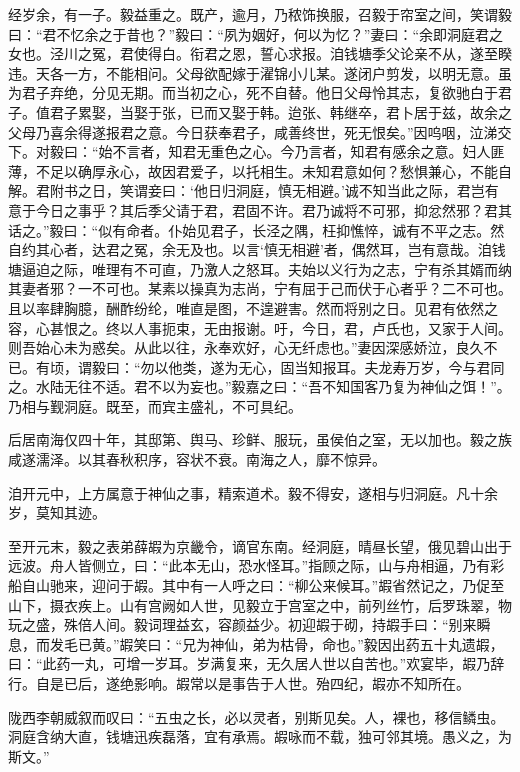 \documentclass[UTF8,titlepage,oneside]{ctexbook}
\begin{document}
经岁余，有一子。毅益重之。既产，逾月，乃秾饰换服，召毅于帘室之间，笑谓毅曰：“君不忆余之于昔也？”毅曰：“夙为姻好，何以为忆？”妻曰：“余即洞庭君之女也。泾川之冤，君使得白。衔君之恩，誓心求报。洎钱塘季父论亲不从，遂至睽违。天各一方，不能相问。父母欲配嫁于濯锦小儿某。遂闭户剪发，以明无意。虽为君子弃绝，分见无期。而当初之心，死不自替。他日父母怜其志，复欲驰白于君子。值君子累娶，当娶于张，已而又娶于韩。迨张、韩继卒，君卜居于兹，故余之父母乃喜余得遂报君之意。今日获奉君子，咸善终世，死无恨矣。”因呜咽，泣涕交下。对毅曰：“始不言者，知君无重色之心。今乃言者，知君有感余之意。妇人匪薄，不足以确厚永心，故因君爱子，以托相生。未知君意如何？愁惧兼心，不能自解。君附书之日，笑谓妾曰：‘他日归洞庭，慎无相避。’诚不知当此之际，君岂有意于今日之事乎？其后季父请于君，君固不许。君乃诚将不可邪，抑忿然邪？君其话之。”毅曰：“似有命者。仆始见君子，长泾之隅，枉抑憔悴，诚有不平之志。然自约其心者，达君之冤，余无及也。以言‘慎无相避’者，偶然耳，岂有意哉。洎钱塘逼迫之际，唯理有不可直，乃激人之怒耳。夫始以义行为之志，宁有杀其婿而纳其妻者邪？一不可也。某素以操真为志尚，宁有屈于己而伏于心者乎？二不可也。且以率肆胸臆，酬酢纷纶，唯直是图，不遑避害。然而将别之日。见君有依然之容，心甚恨之。终以人事扼束，无由报谢。吁，今日，君，卢氏也，又家于人间。则吾始心未为惑矣。从此以往，永奉欢好，心无纤虑也。”妻因深感娇泣，良久不已。有顷，谓毅曰：“勿以他类，遂为无心，固当知报耳。夫龙寿万岁，今与君同之。水陆无往不适。君不以为妄也。”毅嘉之曰：“吾不知国客乃复为神仙之饵！”。乃相与觐洞庭。既至，而宾主盛礼，不可具纪。

后居南海仅四十年，其邸第、舆马、珍鲜、服玩，虽侯伯之室，无以加也。毅之族咸遂濡泽。以其春秋积序，容状不衰。南海之人，靡不惊异。

洎开元中，上方属意于神仙之事，精索道术。毅不得安，遂相与归洞庭。凡十余岁，莫知其迹。

至开元末，毅之表弟薛嘏为京畿令，谪官东南。经洞庭，晴昼长望，俄见碧山出于远波。舟人皆侧立，曰：“此本无山，恐水怪耳。”指顾之际，山与舟相逼，乃有彩船自山驰来，迎问于嘏。其中有一人呼之曰：“柳公来候耳。”嘏省然记之，乃促至山下，摄衣疾上。山有宫阙如人世，见毅立于宫室之中，前列丝竹，后罗珠翠，物玩之盛，殊倍人间。毅词理益玄，容颜益少。初迎嘏于砌，持嘏手曰：“别来瞬息，而发毛已黄。”嘏笑曰：“兄为神仙，弟为枯骨，命也。”毅因出药五十丸遗嘏，曰：“此药一丸，可增一岁耳。岁满复来，无久居人世以自苦也。”欢宴毕，嘏乃辞行。自是已后，遂绝影响。嘏常以是事告于人世。殆四纪，嘏亦不知所在。

陇西李朝威叙而叹曰：“五虫之长，必以灵者，别斯见矣。人，裸也，移信鳞虫。洞庭含纳大直，钱塘迅疾磊落，宜有承焉。嘏咏而不载，独可邻其境。愚义之，为斯文。”
\end{document}
